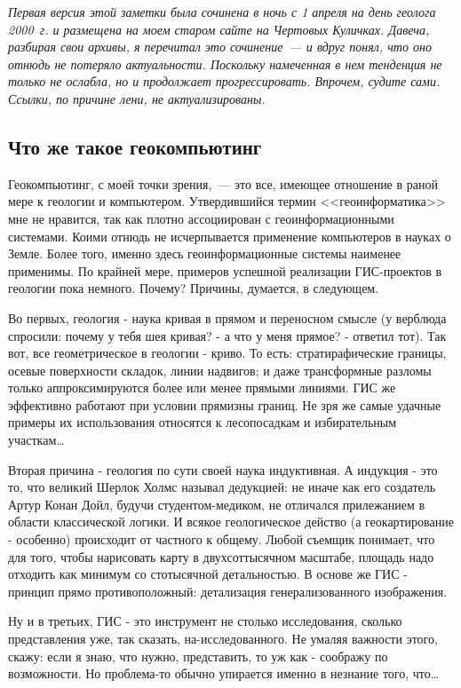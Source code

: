 \textsl{Первая версия этой заметки была сочинена в ночь с 1 апреля на день геолога 2000~г. и размещена на моем старом сайте на Чертовых Куличках. Давеча, разбирая свои архивы, я перечитал это сочинение~--- и вдруг понял, что оно отнюдь не потеряло актуальности. Поскольку намеченная в нем тенденция не только не ослабла, но и продолжает прогрессировать. Впрочем, судите сами. Ссылки, по причине лени, не актуализированы.}

\subsection{Что же такое геокомпьютинг}

Геокомпьютинг, с моей точки зрения,~--- это все, имеющее отношение в раной мере к геологии и компьютером. Утвердившийся термин <<геоинформатика>> мне не нравится, так как плотно ассоциирован с геоинформационными системами. Коими отнюдь не исчерпывается применение компьютеров в науках о Земле. Более того, именно здесь геоинформационные системы наименее применимы. По крайней мере, примеров успешной реализации ГИС-проектов в геологии пока немного. Почему? Причины, думается, в следующем.

Во первых, геология - наука кривая в прямом и переносном смысле (у верблюда спросили: почему у тебя шея кривая? - а что у меня прямое? - ответил тот). Так вот, все геометрическое в геологии - криво. То есть: стратирафические границы, осевые поверхности складок, линии надвигов; и даже трансформные разломы только аппроксимируются более или менее прямыми линиями. ГИС же эффективно работают при условии прямизны границ. Не зря же самые удачные примеры их использования относятся к лесопосадкам и избирательным участкам\dots

Вторая причина - геология по сути своей наука индуктивная. А индукция - это то, что великий Шерлок Холмс называл дедукцией: не иначе как его создатель Артур Конан Дойл, будучи студентом-медиком, не отличался прилежанием в области классической логики. И всякое геологическое действо (а геокартирование - особенно) происходит от частного к общему. Любой съемщик понимает, что для того, чтобы нарисовать карту в двухсоттысячном масштабе, площадь надо отходить как минимум со стотысячной детальностью. В основе же ГИС - принцип прямо противоположный: детализация генерализованного изображения.

Ну и в третьих, ГИС - это инструмент не столько исследования, сколько представления уже, так сказать, на-исследованного. Не умаляя важности этого, скажу: если я знаю, что нужно, представить, то уж как - соображу по возможности. Но проблема-то обычно упирается именно в незнание того, что\dots

